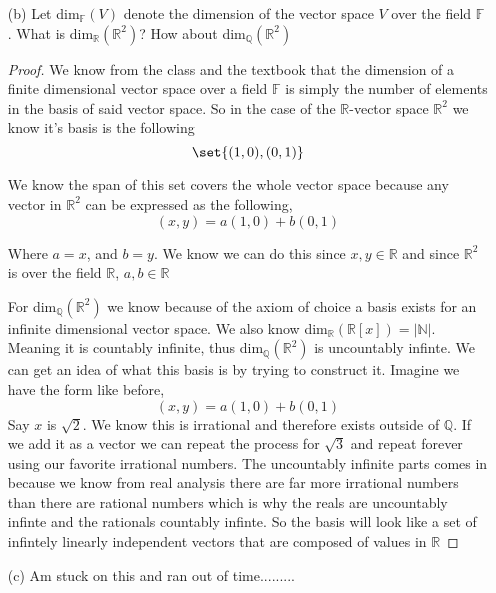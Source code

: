 \documentclass[12pt]{article}
\DeclarePairedDelimiter\set\{\}
\newcommand      {\Nm}         {{\mathbb N}}
\newcommand      {\Qm}         {{\mathbb Q}}
\newcommand      {\Rm}         {{\mathbb R}}
\newcommand      {\Fm}          {{\mathbb F}}
\begin{document}
\begin{itemize}
\begin{itemize}
\begin{proof}
            We can now let this collection $S$ be the collection of all linearly independent subsets of $V$. Because the union of an increasing chain of linearly independent sets is also a linearly independent set, we can apply Zorn's Lemma as stated before and gurantee that there will be a maximal linaerly independent set in this collection. This maximal linearly independent set will then serve as the basis for $V$. The reason we know it can is if there were to exist another linearly independent vector in $V$ not covered by the span of the maximal set, then that would be a contradiciton since the maximal set by defintion cannot be properly contained by another subset.
        \end{proof}
        \item[(b)] Let dim$_\Fm (V)$ denote the dimension of the vector space $V$ over the field $\Fm$. What is  dim$_\Rm(\Rm^2)$? How about dim$_\Qm(\Rm^2)$
        \begin{proof}
            We know from the class and the textbook that the dimension of a finite dimensional vector space over a field $\Fm$ is simply the number of elements in the basis of said vector space. So in the case of the $\Rm$-vector space $\Rm^2$ we know it's basis is the following \[\set{(1,0),(0,1)}\]

            We know the span of this set covers the whole vector space because any vector in $\Rm^2$ can be expressed as the following,
            \[(x,y) = a(1,0)+b(0,1)\]

            Where $a =x$, and $b = y$. We know we can do this since $x,y \in \Rm$ and since $\Rm^2$ is over the field $\Rm$, $a,b\in \Rm$ 
            
            For dim$_\Qm(\Rm^2)$ we know because of the axiom of choice a basis exists for an infinite dimensional vector space. We also know dim$_\Rm(\Rm[x]) = |\Nm| $. Meaning it is countably infinite, thus dim$_\Qm(\Rm^2)$ is uncountably infinte. We can get an idea of what this basis is by trying to construct it. Imagine we have the form like before,
            \[(x,y) = a(1,0) + b(0,1)\]
            Say $x$ is $\sqrt{2}$. We know this is irrational and therefore exists outside of $\Qm$. If we add it as a vector we can repeat the process for $\sqrt{3}$ and repeat forever using our favorite irrational numbers. The uncountably infinite parts comes in because we know from real analysis there are far more irrational numbers than there are rational numbers which is why the reals are uncountably infinte and the rationals countably infinte. So the basis will look like a set of infintely linearly independent vectors that are composed of values in $\Rm$
        \end{proof}

        \item[(c)] Am stuck on this and ran out of time.........
    \end{itemize}

\end{itemize}
\end{document}
